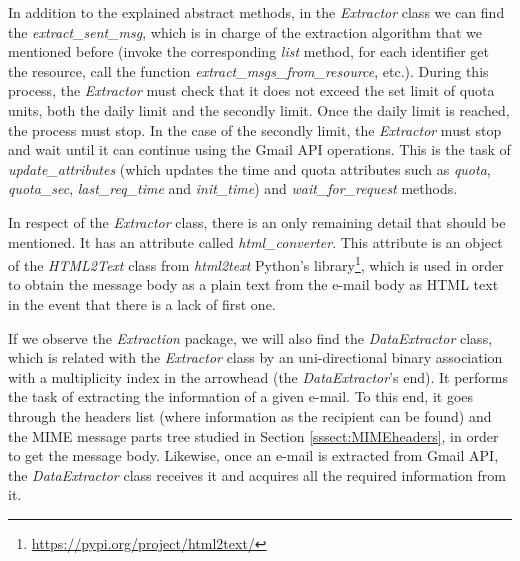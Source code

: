 In addition to the explained abstract methods, in the \textit{Extractor} class we can find the \textit{extract\_sent\_msg}, which is in charge of the extraction algorithm that we mentioned before (invoke the corresponding \textit{list} method, for each identifier get the resource, call the function \textit{extract\_msgs\_from\_resource}, etc.). During this process, the \textit{Extractor} must check that it does not exceed the set limit of quota units, both the daily limit and the secondly limit. Once the daily limit is reached, the process must stop. In the case of the secondly limit, the \textit{Extractor} must stop and wait until it can continue using the Gmail API operations. This is the task of \textit{update\_attributes} (which updates the time and quota attributes such as \textit{quota}, \textit{quota\_sec}, \textit{last\_req\_time} and \textit{init\_time}) and \textit{wait\_for\_request} methods.

In respect of the \textit{Extractor} class, there is an only remaining detail that should be mentioned. It has an attribute called \textit{html\_converter}. This attribute is an object of the \textit{HTML2Text} class from \textit{html2text} Python's library\footnote{\url{https://pypi.org/project/html2text/}}, which is used in order to obtain the message body as a plain text from the e-mail body as HTML text in the event that there is a lack of first one.

If we observe the \textit{Extraction} package, we will also find the \textit{DataExtractor} class, which is related with the \textit{Extractor} class by an uni-directional binary association with a multiplicity index in the arrowhead (the \textit{DataExtractor}'s end). It performs the task of extracting the information of a given e-mail. To this end, it goes through the headers list (where information as the recipient can be found) and the MIME message parts tree studied in Section \ref{sssect:MIMEheaders}, in order to get the message body. Likewise, once an e-mail is extracted from Gmail API, the \textit{DataExtractor} class receives it and acquires all the required information from it.